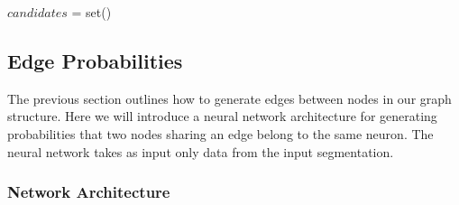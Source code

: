 	\begin{algorithmic}
				\State $candidates$ = set()
					
				\EndFor
			\EndFor
		\EndFunction
	\end{algorithmic}
\subsection{Edge Probabilities}

The previous section outlines how to generate edges between nodes in our graph structure. Here we will introduce a neural network architecture for generating probabilities that two nodes sharing an edge belong to the same neuron. The neural network takes as input only data from the input segmentation. 

\subsubsection{Network Architecture}

